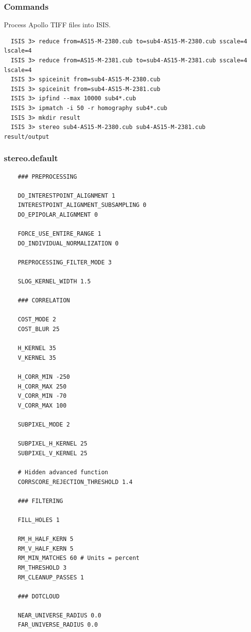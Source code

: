 \subsubsection*{Commands}

Process Apollo TIFF files into \ac{ISIS}.
\begin{verbatim}
  ISIS 3> reduce from=AS15-M-2380.cub to=sub4-AS15-M-2380.cub sscale=4 lscale=4
  ISIS 3> reduce from=AS15-M-2381.cub to=sub4-AS15-M-2381.cub sscale=4 lscale=4
  ISIS 3> spiceinit from=sub4-AS15-M-2380.cub
  ISIS 3> spiceinit from=sub4-AS15-M-2381.cub
  ISIS 3> ipfind --max 10000 sub4*.cub
  ISIS 3> ipmatch -i 50 -r homography sub4*.cub
  ISIS 3> mkdir result
  ISIS 3> stereo sub4-AS15-M-2380.cub sub4-AS15-M-2381.cub result/output
\end{verbatim}

\subsubsection*{stereo.default}
\begin{verbatim}
    ### PREPROCESSING

    DO_INTERESTPOINT_ALIGNMENT 1
    INTERESTPOINT_ALIGNMENT_SUBSAMPLING 0
    DO_EPIPOLAR_ALIGNMENT 0

    FORCE_USE_ENTIRE_RANGE 1
    DO_INDIVIDUAL_NORMALIZATION 0

    PREPROCESSING_FILTER_MODE 3

    SLOG_KERNEL_WIDTH 1.5

    ### CORRELATION

    COST_MODE 2
    COST_BLUR 25

    H_KERNEL 35
    V_KERNEL 35

    H_CORR_MIN -250
    H_CORR_MAX 250
    V_CORR_MIN -70
    V_CORR_MAX 100

    SUBPIXEL_MODE 2

    SUBPIXEL_H_KERNEL 25
    SUBPIXEL_V_KERNEL 25

    # Hidden advanced function
    CORRSCORE_REJECTION_THRESHOLD 1.4

    ### FILTERING

    FILL_HOLES 1

    RM_H_HALF_KERN 5
    RM_V_HALF_KERN 5
    RM_MIN_MATCHES 60 # Units = percent
    RM_THRESHOLD 3
    RM_CLEANUP_PASSES 1

    ### DOTCLOUD

    NEAR_UNIVERSE_RADIUS 0.0
    FAR_UNIVERSE_RADIUS 0.0
\end{verbatim}



